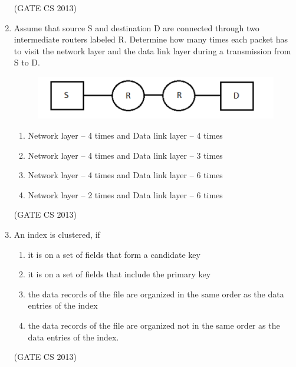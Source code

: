 \documentclass[a4paper, 11pt]{article}
\begin{document}
\begin{enumerate}
    \hfill (GATE CS 2013) 

    \item Assume that source S and destination D are connected through two intermediate routers labeled R. Determine how many times each packet has to visit the network layer and the data link layer during a transmission from S to D. 
    \begin{figure}[H]
        \centering
        \includegraphics[width=\columnwidth]{figs/q14.png}
        \label{fig:placeholder}
    \end{figure}
    \begin{enumerate}
        \item Network layer – 4 times and Data link layer – 4 times 
        \item Network layer – 4 times and Data link layer – 3 times 
        \item Network layer – 4 times and Data link layer – 6 times 
        \item Network layer – 2 times and Data link layer – 6 times 
    \end{enumerate}

    \hfill (GATE CS 2013)

    \item An index is clustered, if
    \begin{enumerate}
        \item it is on a set of fields that form a candidate key
        \item it is on a set of fields that include the primary key
        \item the data records of the file are organized in the same order as the data entries of the index
        \item the data records of the file are organized not in the same order as the data entries of the index.
    \end{enumerate}

    \hfill (GATE CS 2013)


\end{enumerate}
\end{document}
